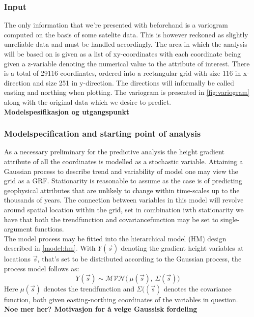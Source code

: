 \documentclass{article}
\begin{document}
\subsubsection{Input}
The only information that we're presented with beforehand is a variogram computed on the basis of some satelite data. This is however reckoned as slightly unreliable data and must be handled accordingly. The area in which the analysis will be based on is given as a list of xy-coordinates with each coordinate being given a z-variable denoting the numerical value to the attribute of interest. There is a total of 29116 coordinates, ordered into a rectangular grid with size 116 in x-direction and size 251 in y-direction. The directions will informally be called easting and northing when plotting. The variogram is presented in \ref{fig:variogram} along with the original data which we desire to predict. \\

\textbf{Modelspesifikasjon og utgangspunkt} \\
\subsubsection{Modelspecification and starting point of analysis} \label{subs:model}
As a necessary preliminary for the predictive analysis the height gradient attribute of all the coordinates is modelled as a stochastic variable. Attaining a Gaussian process to describe trend and variability of model one may view the grid as a GRF. Stationarity is reasonable to assume as the case is of predicting geophysical attributes that are unlikely to change within time-scales up to the thousands of years. The connection between variables in this model will revolve around spatial location within the grid, set in combination iwth stationarity we have that both the trendfunction and covariancefunction may be set to single-argument functions. \\
The model process may be fitted into the hierarchical model (HM) design described in \ref{model:hm}. With $Y(\vec{s})$ denoting the gradient height variables at locations $\vec{s}$, that's set to be distributed according to the Gaussian process, the process model follows as:
\begin{equation}
Y(\vec{s}) \sim \mathcal{MVN} \big( \ \mu(\vec{s}), \ \Sigma (\vec{s}) \big) 
\end{equation}
Here $\mu(\vec{s})$ denotes the trendfunction and $\Sigma((\vec{s})$ denotes the covariance function, both given easting-northing coordinates of the variables in question. \textbf{Noe mer her? Motivasjon for å velge Gaussisk fordeling} \\
\end{document}
